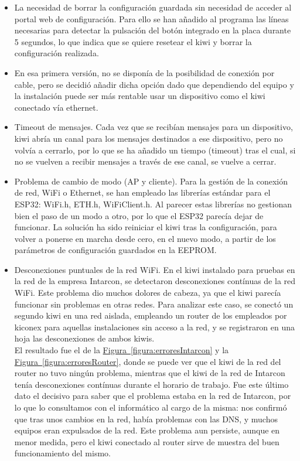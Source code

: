 \begin{itemize}
  \item La necesidad de borrar la configuración guardada sin necesidad de acceder al portal web de configuración. Para ello se han añadido al programa las líneas necesarias para detectar la pulsación del botón integrado en la placa durante 5 segundos, lo que indica que se quiere resetear el kiwi y borrar la configuración realizada.
  \item En esa primera versión, no se disponía de la posibilidad de conexión por cable, pero se decidió añadir dicha opción dado que dependiendo del equipo y la instalación puede ser más rentable usar un dispositivo como el kiwi conectado vía ethernet.
  \item Timeout de mensajes. Cada vez que se recibían mensajes para un dispositivo, kiwi abría un canal para los mensajes destinados a ese dispositivo, pero no volvía a cerrarlo, por lo que se ha añadido un tiempo (timeout) tras el cual, si no se vuelven a recibir mensajes a través de ese canal, se vuelve a cerrar. 
  \item Problema de cambio de modo (AP y cliente). Para la gestión de la conexión de red, WiFi o Ethernet, se han empleado las librerías estándar para el ESP32: WiFi.h, ETH.h, WiFiClient.h. Al parecer estas librerías no gestionan bien el paso de un modo a otro, por lo que el ESP32 parecía dejar de funcionar. La solución ha sido reiniciar el kiwi tras la configuración, para volver a ponerse en marcha desde cero, en el nuevo modo, a partir de los parámetros de configuración guardados en la EEPROM.
  \item Desconexiones puntuales de la red WiFi. En el kiwi instalado para pruebas en la red de la empresa Intarcon, se detectaron desconexiones contínuas de la red WiFi. Este problema dio muchos dolores de cabeza, ya que el kiwi parecía funcionar sin problemas en otras redes. Para analizar este caso, se conectó un segundo kiwi en una red aislada, empleando un router de los empleados por kiconex para aquellas instalaciones sin acceso a la red, y se registraron en una hoja las desconexiones de ambos kiwis. \\ El resultado fue el de la \hyperref[figura:erroresIntarcon]{Figura~\ref{figura:erroresIntarcon}} y la \hyperref[figura:erroresRouter]{Figura~\ref{figura:erroresRouter}}, donde se puede ver que el kiwi de la red del router no tuvo ningún problema, mientras que el kiwi de la red de Intarcon tenía desconexiones contínuas durante el horario de trabajo. Fue este último dato el decisivo para saber que el problema estaba en la red de Intarcon, por lo que lo consultamos con el informático al cargo de la misma: nos confirmó que tras unos cambios en la red, había problemas con las DNS, y muchos equipos eran expulsados de la red. Este problema aun persiste, aunque en menor medida, pero el kiwi conectado al router sirve de muestra del buen funcionamiento del mismo.
\end{itemize}

